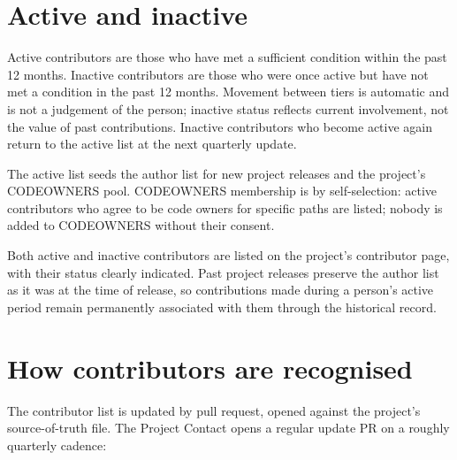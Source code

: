 \documentclass[11pt,a4paper]{article}
\begin{document}
\section*{Active and inactive}

Active contributors are those who have met a sufficient condition within the past
12 months. Inactive contributors are those who were once active but have not met a
condition in the past 12 months. Movement between tiers is automatic and is not a
judgement of the person; inactive status reflects current involvement, not the value
of past contributions. Inactive contributors who become active again return to the
active list at the next quarterly update.

The active list seeds the author list for new project releases and the project's
CODEOWNERS pool. CODEOWNERS membership is by self-selection: active contributors who
agree to be code owners for specific paths are listed; nobody is added to CODEOWNERS
without their consent.

Both active and inactive contributors are listed on the project's contributor page,
with their status clearly indicated. Past project releases preserve the author list
as it was at the time of release, so contributions made during a person's active
period remain permanently associated with them through the historical record.

\section*{How contributors are recognised}

The contributor list is updated by pull request, opened against the project's
source-of-truth file. The Project Contact opens a regular update PR on a roughly
quarterly cadence:
\end{document}
